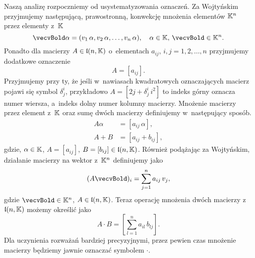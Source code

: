 \documentclass[a4paper,11pt]{article}
\numberwithin{equation}{section}
\begin{document}
Naszą analizę rozpoczniemy od usystematyzowania oznaczeń. Za Wojtyńskim
przyjmujemy następującą, prawostronną, konwekcję mnożenia elementów
$\mathbb{K}^{ n }$ przez elementy z~$\mathbb{K}$
\begin{equation}
  \label{eq:Wojtynski-41}
  \vecvBold \alpha = ( v_{ 1 } \, \alpha, v_{ 2 } \, \alpha, \ldots, v_{ n } \, \alpha ), \quad
  \alpha \in \Kbb, \, \vecvBold \in \Kbb^{ n }.
\end{equation}
Ponadto dla macierzy $A \in \mathfrak{l}( n, \mathbb{K} )$ o~elementach $a_{ i j }$,
$i, j = 1, 2, \ldots, n$ przyjmujemy dodatkowe oznaczenie
\begin{equation}
  \label{eq:Wojtynski-42}
  A = [ a_{ i j } ].
\end{equation}
Przyjmujemy przy ty, że jeśli w~nawiasach kwadratowych oznaczających macierz
pojawi się symbol $\delta^{ i }_{ j }$, przykładowo
$A = [ 2 j + \delta^{ i }_{ j } \, i^{ 2 } ]$ to indeks górny oznacza numer
wiersza, a~indeks dolny numer kolumny macierzy. Mnożenie macierzy przez
element z~$\mathbb{K}$ oraz sumę dwóch macierzy definiujemy w~następujący sposób.
\begin{subequations}
  \begin{align}
    \label{eq:Wojtynski-43-A}
    A \alpha &= [ a_{ i j } \, \alpha ], \\
    \label{eq:Wojtynski-43-B}
    A + B &= [ a_{ i j } + b_{ i j } ],
  \end{align}
\end{subequations}
gdzie, $\alpha \in \mathbb{K}$, $A = [ a_{ i j } ]$,
$B = [ b_{ i j } ] \in \mathfrak{l}( n, \mathbb{K} )$.
Również podążając za Wojtyńskim, działanie macierzy na wektor z~$\mathbb{K}^{ n }$
definiujemy jako
\begin{equation}
  \label{eq:Wojtynski-44}
  ( A \vecvBold )_{ i } = \sum_{ j = 1 }^{ n } a_{ i j } \, v_{ j },
\end{equation}
gdzie $\vecvBold \in \Kbb^{ n }$, $A \in \mathfrak{l}( n, \mathbb{K} )$. Teraz operację
mnożenia dwóch macierzy z~$\mathfrak{l}( n, \mathbb{K} )$ możemy określić jako
\begin{equation}
  \label{eq:Wojtynski-45}
  A \cdot B = \left[ \sum_{ l = 1 }^{ n } a_{ i l } \, b_{ l j } \right].
\end{equation}
Dla uczynienia rozważań bardziej precyzyjnymi, przez pewien czas mnożenie
macierzy będziemy jawnie oznaczać symbolem $\cdot$.
\end{document}
